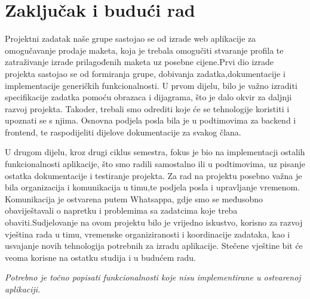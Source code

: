 \chapter{Zaključak i budući rad}		
		 \noindent Projektni zadatak naše grupe sastojao se od izrade web aplikacije za omogučavanje prodaje maketa, koja je trebala omogučiti stvaranje profila te zatraživanje izrade prilagođenih maketa uz posebne cijene.Prvi dio izrade projekta sastojao se od formiranja grupe, dobivanja zadatka,dokumentacije i implementacije generičkih funkcionalnosti. U prvom dijelu, bilo je važno izraditi specifikacije zadatka pomoću obrazaca i dijagrama, što je dalo okvir za daljnji razvoj projekta. Takoder, trebali smo odrediti koje će se tehnologije koristiti i upoznati se s njima. Osnovna podjela posla bila je u podtimovima za backend i frontend, te raspodijeliti dijelove dokumentacije za svakog člana.

		\noindent U drugom dijelu, kroz drugi ciklus semestra, fokus je bio na implementacji ostalih funkcionalnosti aplikacije, što smo radili samostalno ili u podtimovima, uz pisanje ostatka dokumentacije i testiranje projekta. Za rad na projektu posebno važna je bila organizacija i komunikacija u timu,te podjela posla i upravljanje vremenom. Komunikacija je ostvarena putem Whatsappa, gdje smo se međusobno obaviještavali o napretku i problemima sa zadatcima koje treba obaviti.Sudjelovanje na ovom projektu bilo je vrijedno iskustvo, korisno za razvoj vještina rada u timu, vremenske organiziranosti i koordinacije zadataka, kao i usvajanje novih tehnologija potrebnih za izradu aplikacije. Stečene vještine bit će veoma korisne na ostatku studija i u budućem radu.

		
		 \textit{Potrebno je točno popisati funkcionalnosti koje nisu implementirane u ostvarenoj aplikaciji.}
		
		\eject 